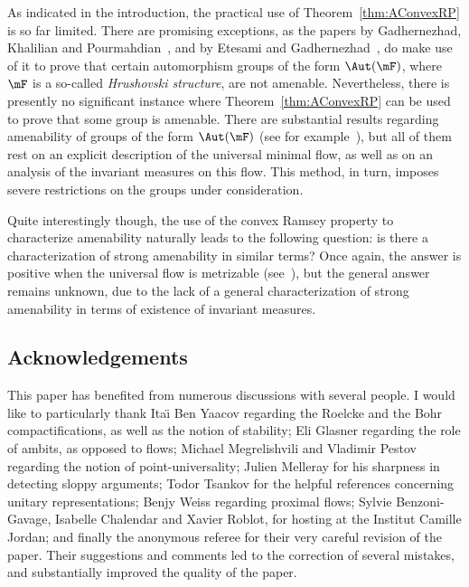 As indicated in the introduction, the practical use of Theorem~\ref{thm:AConvexRP} is so far limited. There are promising exceptions, as the papers by Gadhernezhad, Khalilian and Pourmahdian~\cite{GKP}, and by Etesami and Gadhernezhad~\cite{EG}, do make use of it to prove that certain automorphism groups of the form $\Aut(\mF)$, where $\mF$ is a so-called \emph{Hrushovski structure}, are not amenable. Nevertheless, there is presently no significant instance where Theorem~\ref{thm:AConvexRP} can be used to prove that some group is amenable. There are substantial results regarding amenability of groups of the form $\Aut(\mF)$ (see for example~\cite{AKL, PS}), but all of them rest on an explicit description of the universal minimal flow, as well as on an analysis of the invariant measures on this flow. This method, in turn, imposes severe restrictions on the groups under consideration.

Quite interestingly though, the use of the convex Ramsey property to characterize amenability naturally leads to the following question: is there a characterization of strong amenability in similar terms? Once again, the answer is positive when the universal flow is metrizable (see~\cite{MNT}), but the general answer remains unknown, due to the lack of a general characterization of strong amenability in terms of existence of invariant measures.


\subsection*{Acknowledgements}

This paper has benefited from numerous discussions with several people. I would like to particularly thank Ita\"{\i} Ben Yaacov regarding the Roelcke and the Bohr compactifications, as well as the notion of stability; Eli Glasner regarding the role of ambits, as opposed to flows; Michael Megrelishvili and Vladimir Pestov regarding the notion of point-universality; Julien Melleray for his sharpness in detecting sloppy arguments; Todor Tsankov for the helpful references concerning unitary representations; Benjy Weiss regarding proximal flows; Sylvie Benzoni-Gavage, Isabelle Chalendar and Xavier Roblot, for hosting at the Institut Camille Jordan; and finally the anonymous referee for their very careful revision of the paper. Their suggestions and comments led to the correction of several mistakes, and substantially improved the quality of the paper.



